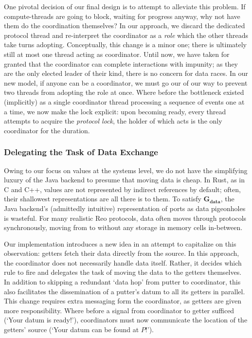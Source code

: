 One pivotal decision of our final design is to attempt to alleviate this problem. If compute-threads are going to block, waiting for progress anyway, why not have them do the coordination themselves? In our approach, we discard the dedicated protocol thread and re-interpret the coordinator as a \textit{role} which the other threads take turns adopting. Conceptually, this change is a minor one; there is ultimately still at most one thread acting as coordinator. Until now, we have taken for granted that the coordinator can complete interactions with impunity; as they are the only elected leader of their kind, there is no concern for data races. In our new model, if anyone can be a coordinator, we must go our of our way to prevent two threads from adopting the role at once. Where before the bottleneck existed (implicitly) as a single coordinator thread processing a sequence of events one at a time, we now make the lock explicit: upon becoming ready, every thread attempts to acquire the \textit{protocol lock}, the holder of which acts is the only coordinator for the duration.

\subsubsection{Delegating the Task of Data Exchange}
Owing to our focus on values at the systems level, we do not have the simplifying luxury of the Java backend to presume that moving data is cheap. In Rust, as in C and C++, values are not represented by indirect references by default; often, their shallowest representations are all there is to them. To satisfy $\boldsymbol{G_{data}}$, the Java backend's (admittedly intuitive) representation of ports as data pigeonholes is wasteful. For many realistic Reo protocols, data often moves through protocols synchronously, moving from  to  without any storage in memory cells in-between. 

Our implementation introduces a new idea in an attempt to capitalize on this observation: getters fetch their data directly from the source. In this approach, the coordinator does not necessarily handle data itself. Rather, it decides which rule to fire and delegates the task of moving the data to the getters themselves. In addition to skipping a redundant `data hop' from putter to coordinator, this also facilitates the dissemination of a putter's datum to all its getters in parallel. This change requires extra messaging form the coordinator, as getters are given more responsibility. Where before a signal from coordinator to getter sufficed (`Your datum is ready!'), coordinators must now communicate the location of the getters' source (`Your datum can be found at $P$!').


